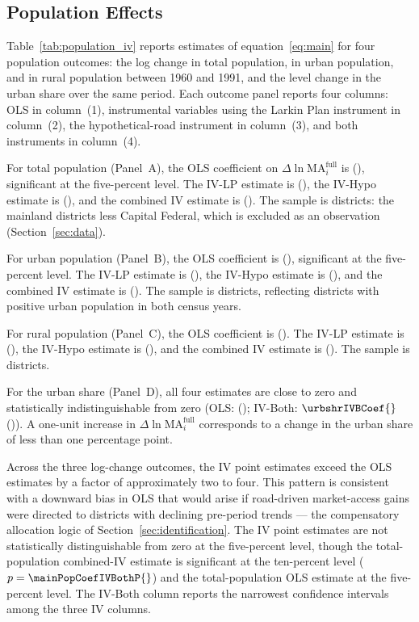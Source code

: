 \subsection{Population Effects}
\label{sec:population}

Table~\ref{tab:population_iv} reports estimates of equation~\eqref{eq:main}
for four population outcomes: the log change in total population, in
urban population, and in rural population between 1960 and 1991, and
the level change in the urban share over the same period. Each
outcome panel reports four columns: OLS in column~(1), instrumental
variables using the Larkin Plan instrument in column~(2), the
hypothetical-road instrument in column~(3), and both instruments in
column~(4).

For total population (Panel~A), the OLS coefficient on $\Delta \ln
\mathrm{MA}^{\mathrm{full}}_i$ is \popOLSCoef{} (\popOLSSE{}), significant at the
five-percent level. The IV-LP estimate is \popIVLPCoef{} (\popIVLPSE{}), the IV-Hypo
estimate is \popIVHCoef{} (\popIVHSE{}), and the combined IV estimate is
\mainPopCoefIVBoth{} (\mainPopSEIVBoth{}). The sample is
\mainPopNIVBoth{} districts: the \nDistricts{} mainland districts less Capital
Federal, which is excluded as an observation
(Section~\ref{sec:data}).

For urban population (Panel~B), the OLS coefficient is \urbOLSCoef{} (\urbOLSSE{}),
significant at the five-percent level. The IV-LP estimate is \urbIVLPCoef{}
(\urbIVLPSE{}), the IV-Hypo estimate is \urbIVHCoef{} (\urbIVHSE{}), and the combined IV
estimate is \urbIVBCoef{} (\urbIVBSE{}). The sample is \urbN{} districts, reflecting
districts with positive urban population in both census years.

For rural population (Panel~C), the OLS coefficient is \rurOLSCoef{} (\rurOLSSE{}).
The IV-LP estimate is \rurIVLPCoef{} (\rurIVLPSE{}), the IV-Hypo estimate is \rurIVHCoef{}
(\rurIVHSE{}), and the combined IV estimate is \rurIVBCoef{} (\rurIVBSE{}). The sample is
\rurN{} districts.

For the urban share (Panel~D), all four estimates are close to zero
and statistically indistinguishable from zero (OLS: \urbshrOLSCoef{} (\urbshrOLSSE{});
IV-Both: $\urbshrIVBCoef{}$ (\urbshrIVBSE{})). A one-unit increase in $\Delta \ln
\mathrm{MA}^{\mathrm{full}}_i$ corresponds to a change in the urban
share of less than one percentage point.

Across the three log-change outcomes, the IV point estimates exceed
the OLS estimates by a factor of approximately two to four. This
pattern is consistent with a downward bias in OLS that would arise if
road-driven market-access gains were directed to districts with
declining pre-period trends --- the compensatory allocation logic of
Section~\ref{sec:identification}. The IV point estimates are not
statistically distinguishable from zero at the five-percent level,
though the total-population combined-IV estimate is significant at
the ten-percent level ($p = \mainPopCoefIVBothP{}$) and the
total-population OLS estimate at the five-percent level. The
IV-Both column reports the narrowest confidence intervals among the
three IV columns.

